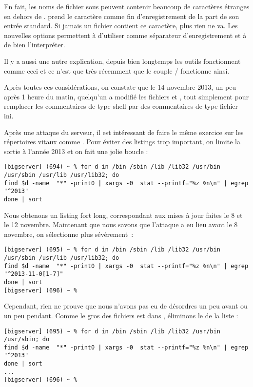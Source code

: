 En fait, les noms de fichier sous \unix{} peuvent contenir beaucoup de caractères étranges en dehors de \code{/}.  prend le caractère  comme fin d'enregistrement de la part de son entrée standard. Si jamais un fichier contient ce caractère, plus rien ne va. Les nouvelles options permettent à  d'utiliser  comme séparateur d'enregistrement et à  de bien l'interpréter.

Il y a aussi une autre explication, depuis bien longtemps les outils \GNU{} fonctionnent comme ceci et ce n'est que très récemment que le couple / fonctionne ainsi.

Après toutes ces considérations, on constate que le 14 novembre 2013, un peu après 1 heure du matin, quelqu'un a modifié les fichiers   et , tout simplement pour remplacer les commentaires de type shell par des commentaires de type fichier ini.

Après une attaque du serveur, il est intéressant de faire le même exercice sur les répertoires vitaux comme . Pour éviter des listings trop important, on limite la sortie à l'année 2013 et on fait une jolie boucle :

\begin{lstlisting}[caption=recherche d'une attaque part I]
[bigserver] (694) ~ % for d in /bin /sbin /lib /lib32 /usr/bin /usr/sbin /usr/lib /usr/lib32; do
find $d -name  "*" -print0 | xargs -0  stat --printf="%z %n\n" | egrep "^2013"
done | sort
\end{lstlisting}

Nous obtenons un listing fort long, correspondant aux mises à jour faites le 8 et le 12 novembre. Maintenant que nous savons que l'attaque a eu lieu avant le 8 novembre, on sélectionne plus sévèrement :

\begin{lstlisting}[caption=recherche d'une attaque part II]
[bigserver] (695) ~ % for d in /bin /sbin /lib /lib32 /usr/bin /usr/sbin /usr/lib /usr/lib32; do
find $d -name  "*" -print0 | xargs -0  stat --printf="%z %n\n" | egrep "^2013-11-0[1-7]"
done | sort
[bigserver] (696) ~ %
\end{lstlisting}

Cependant, rien ne prouve que nous n'avons pas eu de désordres un peu avant ou un peu pendant. Comme le gros des fichiers est dans , éliminons le de la liste :

\begin{lstlisting}[caption=recherche d'une attaque part III]
[bigserver] (695) ~ % for d in /bin /sbin /lib /lib32 /usr/bin /usr/sbin; do
find $d -name  "*" -print0 | xargs -0  stat --printf="%z %n\n" | egrep "^2013"
done | sort
...
[bigserver] (696) ~ %
\end{lstlisting}

